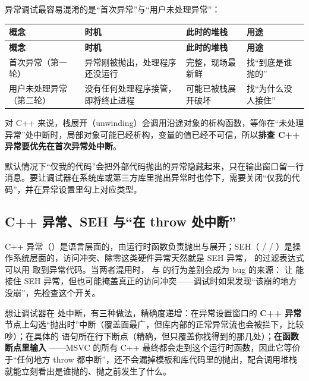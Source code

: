 {异常调试最容易混淆的是“首次异常”与“用户未处理异常”：

\begin{longtable}{L{3.4cm}L{3.6cm}L{3.4cm}L{3.8cm}}\toprule
\textbf{概念} & \textbf{时机} & \textbf{此时的堆栈} & \textbf{用途} \\ \midrule \endfirsthead
\toprule \textbf{概念} & \textbf{时机} & \textbf{此时的堆栈} & \textbf{用途} \\ \midrule \endhead \bottomrule \endlastfoot
首次异常（第一轮） & 异常刚被抛出，处理程序还没运行 & 完整，现场最新鲜 & 找“到底是谁抛的” \\
用户未处理异常（第二轮） & 没有任何处理程序接管，即将终止进程 & 可能已被栈展开破坏 & 找“为什么没人接住” \\
\end{longtable}
对 C++ 来说，栈展开（unwinding）会调用沿途对象的析构函数，等你在“未处理异常”处中断时，局部对象可能已经析构，变量的值已经不可信，所以\textbf{排查 C++ 异常要优先在首次异常处中断}。

\begin{warnbox}[注意]
默认情况下“仅我的代码”会把外部代码抛出的异常隐藏起来，只在输出窗口留一行消息。要让调试器在系统库或第三方库里抛出异常时也停下，需要关闭“仅我的代码”，并在异常设置里勾上对应类型。
\end{warnbox}

\subsection{C++ 异常、SEH 与“在 throw 处中断”}

C++ 异常（）是语言层面的，由运行时函数负责抛出与展开；SEH（ /  / ）是操作系统层面的，访问冲突、除零这类硬件异常天然就是 SEH 异常， 的过滤表达式可以用  取到异常代码。当两者混用时， 与  的行为差别会成为 bug 的来源： 让  能接住 SEH 异常，但也可能掩盖真正的访问冲突——调试时如果发现“该崩的地方没崩”，先检查这个开关。

想让调试器在  处中断，有三种做法，精确度递增：在异常设置窗口的 \textbf{C++ 异常} 节点上勾选“抛出时”中断（覆盖面最广，但库内部的正常异常流也会被拦下，比较吵）；在具体的  语句所在行下断点（精确，但只覆盖你找得到的那几处）；\textbf{在函数断点里输入 }——MSVC 的所有 C++  最终都会走到这个运行时函数，因此它等价于“任何地方 throw 都中断”，还不会漏掉模板和库代码里的抛出，配合调用堆栈就能立刻看出是谁抛的、抛之前发生了什么。

}
